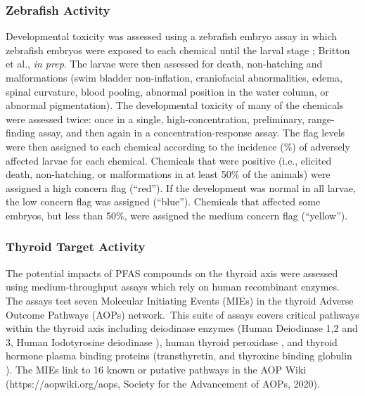 \documentclass[
  super,
  preprint,
  3p]{elsarticle}
\begin{document}
\hypertarget{zebrafish-activity}{%
\subsubsection{Zebrafish Activity}\label{zebrafish-activity}}

Developmental toxicity was assessed using a zebrafish embryo assay in
which zebrafish embryos were exposed to each chemical until the larval
stage \citep{padilla_zebrafish_2012}; Britton et al., \emph{in prep}.
The larvae were then assessed for death, non-hatching and malformations
(swim bladder non-inflation, craniofacial abnormalities, edema, spinal
curvature, blood pooling, abnormal position in the water column, or
abnormal pigmentation). The developmental toxicity of many of the
chemicals were assessed twice: once in a single, high-concentration,
preliminary, range-finding assay, and then again in a
concentration-response assay. The flag levels were then assigned to each
chemical according to the incidence (\%) of adversely affected larvae
for each chemical. Chemicals that were positive (i.e., elicited death,
non-hatching, or malformations in at least 50\% of the animals) were
assigned a high concern flag (``red''). If the development was normal in
all larvae, the low concern flag was assigned (``blue''). Chemicals that
affected some embryos, but less than 50\%, were assigned the medium
concern flag (``yellow'').

\hypertarget{thyroid-target-activity}{%
\subsubsection{Thyroid Target Activity}\label{thyroid-target-activity}}

The potential impacts of PFAS compounds on the thyroid axis were
assessed using medium-throughput assays which rely on human recombinant
enzymes.\, The assays test seven Molecular Initiating Events (MIEs) in
the thyroid Adverse Outcome Pathways (AOPs) network.\, This suite of
assays covers critical pathways within the thyroid axis including
deiodinase enzymes (Human Deiodinase 1,2 and 3, Human Iodotyrosine
deiodinase \citep{olker_screening_2019, olker_vitro_2021}), human
thyroid peroxidase \citep{paul_friedman_tiered_2016}, and thyroid
hormone plasma binding proteins (transthyretin, and thyroxine binding
globulin \citep{montano_new_2012}). The MIEs link to 16 known or
putative pathways in the AOP Wiki (https://aopwiki.org/aops, Society for
the Advancement of AOPs, 2020).
\end{document}
